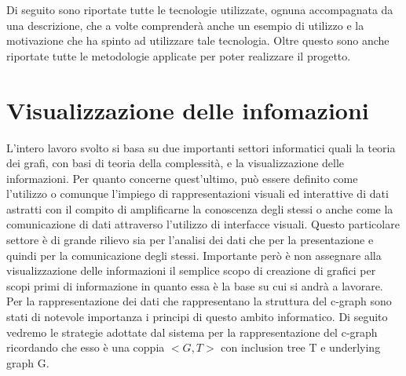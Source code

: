 \large{
Di seguito sono riportate tutte le tecnologie utilizzate, ognuna accompagnata da una descrizione, che a volte comprenderà anche un esempio di utilizzo e la motivazione che ha spinto ad utilizzare tale tecnologia. Oltre questo sono anche riportate tutte le metodologie applicate per poter realizzare il progetto.

\section{Visualizzazione delle infomazioni}
L'intero lavoro svolto si basa su due importanti settori informatici quali la teoria dei grafi, con basi di teoria della complessità, e la visualizzazione delle informazioni. Per quanto concerne quest'ultimo, può essere definito come l'utilizzo o comunque l'impiego di rappresentazioni visuali ed interattive di dati astratti con il compito di amplificarne la conoscenza degli stessi o anche come la comunicazione di dati attraverso l'utilizzo di interfacce visuali. Questo particolare settore è di grande rilievo sia per l'analisi dei dati che per la presentazione e quindi per la comunicazione degli stessi. Importante però è non assegnare alla visualizzazione delle informazioni il semplice scopo di creazione di grafici per scopi primi di informazione in quanto essa è la base su cui si andrà a lavorare. \\
Per la rappresentazione dei dati che rappresentano la struttura del c-graph sono stati di notevole importanza i principi di questo ambito informatico.
Di seguito vedremo le strategie adottate dal sistema per la rappresentazione del c-graph ricordando che esso è una coppia $<G,T>$ con inclusion tree T e underlying graph G. 

}
